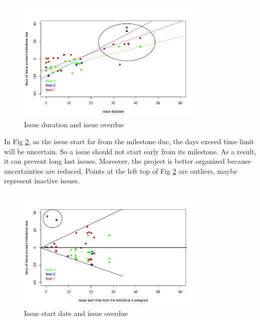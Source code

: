 \documentclass[conference]{IEEEtran}
\begin{document}
\begin{figure}[H]
    \centering
    \includegraphics[width=9cm]{../AprilProject/pic/predict_features/late_issue_vs_issue_duration.png}
    \caption{Issue duration and issue overdue}
    \label{duration_late}
\end{figure}

In Fig \ref{start_late}, as the issue start far from the milestone due, the days exceed time limit will be uncertain. So a issue should not start early from its milestone. As a result, it can prevent long last issues. Moreover, the project is better organized because uncertainties are reduced. Points at the left top of Fig \ref{start_late} are outliers, maybe represent inactive issues.

\begin{figure}[H]
    \centering
    \includegraphics[width=9cm]{../AprilProject/pic/predict_features/late_issue_vs_issue_startfrom_milestone.png}
    \caption{Issue start date and issue overdue}
    \label{start_late}
\end{figure}
\end{document}
